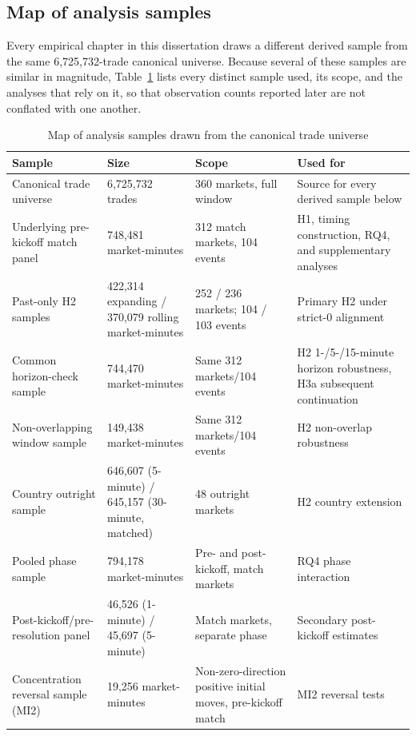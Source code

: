 \subsection{Map of analysis samples}

Every empirical chapter in this dissertation draws a different derived
sample from the same 6,725,732-trade canonical universe. Because several of
these samples are similar in magnitude, Table~\ref{tab:sample-map} lists
every distinct sample used, its scope, and the analyses that rely on it, so
that observation counts reported later are not conflated with one another.

\begin{table}[htbp]
\centering
\caption{Map of analysis samples drawn from the canonical trade universe}
\label{tab:sample-map}
\footnotesize
\begin{tabular}{p{}p{}p{}p{}}
\toprule
Sample & Size & Scope & Used for \\
\midrule
Canonical trade universe & 6,725,732 trades & 360 markets, full window & Source for every derived sample below \\
Underlying pre-kickoff match panel & 748,481 market-minutes & 312 match markets, 104 events & H1, timing construction, RQ4, and supplementary analyses \\
Past-only H2 samples & 422,314 expanding / 370,079 rolling market-minutes & 252 / 236 markets; 104 / 103 events & Primary H2 under strict-0 alignment \\
Common horizon-check sample & 744,470 market-minutes & Same 312 markets/104 events & H2 1-/5-/15-minute horizon robustness, H3a subsequent continuation \\
Non-overlapping window sample & 149,438 market-minutes & Same 312 markets/104 events & H2 non-overlap robustness \\
Country outright sample & 646,607 (5-minute) / 645,157 (30-minute, matched) & 48 outright markets & H2 country extension \\
Pooled phase sample & 794,178 market-minutes & Pre- and post-kickoff, match markets & RQ4 phase interaction \\
Post-kickoff/pre-resolution panel & 46,526 (1-minute) / 45,697 (5-minute) & Match markets, separate phase & Secondary post-kickoff estimates \\
Concentration reversal sample (MI2) & 19,256 market-minutes & Non-zero-direction positive initial moves, pre-kickoff match & MI2 reversal tests \\

\end{tabular}
\end{table}
